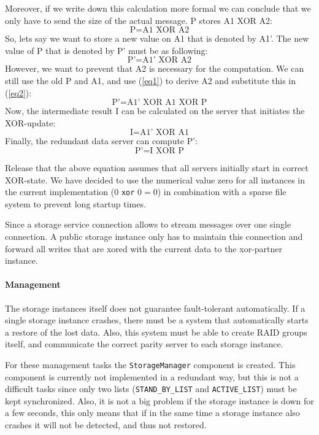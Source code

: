 \documentclass[12pt,a4paper]{scrartcl}
\begin{document}
Moreover, if we write down this calculation more formal we can conclude that we only have to send the size of the actual message. P stores A1 XOR A2:
\begin{equation}\label{eq1}
\text{P} = \text{A1} \text{ XOR } \text{A2}
\end{equation}
So, lets say we want to store a new value on A1 that is denoted by A1’. The new value of P that is denoted by P’ must be as following:
\begin{equation}\label{eq2}
\text{P’} = \text{A1’} \text{ XOR } \text{A2}
\end{equation}
However, we want to prevent that A2 is necessary for the computation. We can still use the old P and A1, and use (\ref{eq1}) to derive A2 and substitute this in (\ref{eq2}):
$$\text{P’} = \text{A1’} \text{ XOR } \text{A1} \text{ XOR } \text{P}$$
Now, the intermediate result I can be calculated on the server that initiates the XOR-update:
$$\text{I} = \text{A1’} \text{ XOR } \text{A1}$$
Finally, the redundant data server can compute P’:
$$\text{P’} = \text{I} \text{ XOR } \text{P}$$

Release that the above equation assumes that all servers initially start in correct XOR-state. We have decided to use the numerical value zero for all instances in the current implementation ($0$ \verb|xor| $0 = 0$) in combination with a sparse file system to prevent long startup times.

Since a storage service connection allows to stream messages over one single connection. A public storage instance only has to maintain this connection and forward all writes that are xored with the current data to the xor-partner instance.

\paragraph{Management}
The storage instances itself does not guarantee fault-tolerant automatically. If a single storage instance crashes, there must be a system that automatically starts a restore of the lost data. Also, this system must be able to create RAID groups itself, and communicate the correct parity server to each storage instance.

For these management tasks the \verb|StorageManager| component is created. This component is currently not implemented in a redundant way, but this is not a difficult tasks since only two lists (\verb|STAND_BY_LIST| and \verb|ACTIVE_LIST|) must be kept synchronized. Also, it is not a big problem if the storage instance is down for a few seconds, this only means that if in the same time a storage instance also crashes it will not be detected, and thus not restored.
\end{document}
